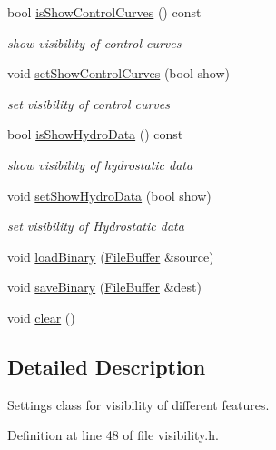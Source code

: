 \begin{DoxyCompactItemize}
bool \hyperlink{classShipCAD_1_1Visibility_adf96eb2133086a34056f6c0f75556f13}{is\-Show\-Control\-Curves} () const 
\begin{DoxyCompactList}\small\item\em show visibility of control curves \end{DoxyCompactList}\item 
void \hyperlink{classShipCAD_1_1Visibility_a760ef76f6db721925ee95cefaae966de}{set\-Show\-Control\-Curves} (bool show)
\begin{DoxyCompactList}\small\item\em set visibility of control curves \end{DoxyCompactList}\item 
bool \hyperlink{classShipCAD_1_1Visibility_a48ceac6b27669e53b197179e81c00126}{is\-Show\-Hydro\-Data} () const 
\begin{DoxyCompactList}\small\item\em show visibility of hydrostatic data \end{DoxyCompactList}\item 
void \hyperlink{classShipCAD_1_1Visibility_afc3530bd2d3fc1e71fa699aace76e4ea}{set\-Show\-Hydro\-Data} (bool show)
\begin{DoxyCompactList}\small\item\em set visibility of Hydrostatic data \end{DoxyCompactList}\item 
void \hyperlink{classShipCAD_1_1Visibility_a418d8fcee4c8f7c0c5c0691249ded677}{load\-Binary} (\hyperlink{classShipCAD_1_1FileBuffer}{File\-Buffer} \&source)
\item 
void \hyperlink{classShipCAD_1_1Visibility_adaf76df822f6f03a93a1b827c81fe58f}{save\-Binary} (\hyperlink{classShipCAD_1_1FileBuffer}{File\-Buffer} \&dest)
\item 
void \hyperlink{classShipCAD_1_1Visibility_af3e925196f71caa8e8ddabd2e7210bbf}{clear} ()
\end{DoxyCompactItemize}


\subsection{Detailed Description}
Settings class for visibility of different features. 

Definition at line 48 of file visibility.\-h.



